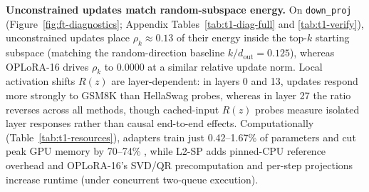 \documentclass{article}
\begin{document}
\textbf{Unconstrained updates match random-subspace energy.} On \texttt{down\_proj} (Figure~\ref{fig:ft-diagnostics}; Appendix Tables~\ref{tab:t1-diag-full} and \ref{tab:t1-verify}), unconstrained updates place $\rho_k \approx 0.13$ of their energy inside the top-$k$ starting subspace (matching the random-direction baseline $k/d_{\text{out}} = 0.125$), whereas OPLoRA-16 drives $\rho_k$ to 0.0000 \citep{xiong2026oplora} at a similar relative update norm. Local activation shifts $R(z)$ are layer-dependent: in layers 0 and 13, updates respond more strongly to GSM8K than HellaSwag probes, whereas in layer 27 the ratio reverses across all methods, though cached-input $R(z)$ probes measure isolated layer responses rather than causal end-to-end effects. Computationally (Table~\ref{tab:t1-resources}), adapters train just 0.42--1.67\% of parameters and cut peak GPU memory by 70--74\% \citep{hu2022lora}, while L2-SP adds pinned-CPU reference overhead \citep{li2018l2sp} and OPLoRA-16's SVD/QR precomputation and per-step projections increase runtime (under concurrent two-queue execution).
\end{document}
